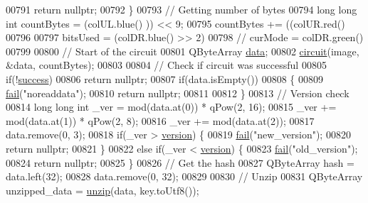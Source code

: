 \begin{DoxyCode}
00791         \textcolor{keywordflow}{return} \textcolor{keyword}{nullptr};
00792     \}
00793     \textcolor{comment}{// Getting number of bytes}
00794     \textcolor{keywordtype}{long} \textcolor{keywordtype}{long} \textcolor{keywordtype}{int} countBytes = (colUL.blue() %
      )) << 9;
00795     countBytes += ((colUR.red() %
00796 
00797     bitsUsed = (colDR.blue() >> 2) %
00798     \textcolor{comment}{// curMode = colDR.green() %
00799 
00800     \textcolor{comment}{// Start of the circuit}
00801     QByteArray \hyperlink{namespace_errors_dict_setup_adf4c30d205d29df7343e26f7c62b0685}{data};
00802     \hyperlink{class_model_p_c_a1d0091062a0c836b283ec2f67411623b}{circuit}(image, &data, countBytes);
00803 
00804     \textcolor{comment}{// Check if circuit was successful}
00805     \textcolor{keywordflow}{if}(!\hyperlink{class_model_p_c_a945ffbbc44a832b953c191debd448f4c}{success})
00806         \textcolor{keywordflow}{return} \textcolor{keyword}{nullptr};
00807     \textcolor{keywordflow}{if}(data.isEmpty())
00808     \{
00809         \hyperlink{class_model_p_c_a47464b59b7e37fcee25e55475708aabd}{fail}(\textcolor{stringliteral}{"noreaddata"});
00810         \textcolor{keywordflow}{return} \textcolor{keyword}{nullptr};
00811 
00812     \}
00813     \textcolor{comment}{// Version check}
00814     \textcolor{keywordtype}{long} \textcolor{keywordtype}{long} \textcolor{keywordtype}{int} \_ver = mod(data.at(0)) * qPow(2, 16);
00815     \_ver += mod(data.at(1)) * qPow(2, 8);
00816     \_ver += mod(data.at(2));
00817     data.remove(0, 3);
00818     \textcolor{keywordflow}{if}(\_ver > \hyperlink{class_model_p_c_a5af48ab89e19be42a94c34ba00249401}{version}) \{
00819         \hyperlink{class_model_p_c_a47464b59b7e37fcee25e55475708aabd}{fail}(\textcolor{stringliteral}{"new\_version"});
00820         \textcolor{keywordflow}{return} \textcolor{keyword}{nullptr};
00821     \}
00822     \textcolor{keywordflow}{else} \textcolor{keywordflow}{if}(\_ver < \hyperlink{class_model_p_c_a5af48ab89e19be42a94c34ba00249401}{version}) \{
00823         \hyperlink{class_model_p_c_a47464b59b7e37fcee25e55475708aabd}{fail}(\textcolor{stringliteral}{"old\_version"});
00824         \textcolor{keywordflow}{return} \textcolor{keyword}{nullptr};
00825     \}
00826     \textcolor{comment}{// Get the hash}
00827     QByteArray hash = data.left(32);
00828     data.remove(0, 32);
00829 
00830     \textcolor{comment}{// Unzip}
00831     QByteArray unzipped\_data = \hyperlink{class_model_p_c_a6da88f166785a49f73b22c169f956fd0}{unzip}(data, key.toUtf8());
}
\end{DoxyCode}
